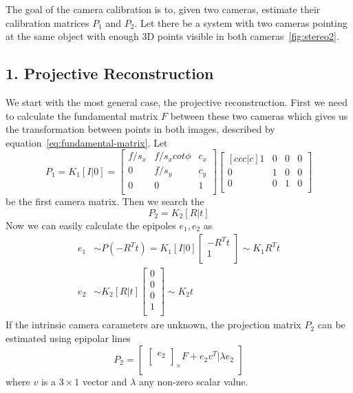 The goal of the camera calibration is to, given two cameras, estimate their calibration matrices $P_1$ and $P_2$. Let there be a system with two cameras pointing at the same object with enough 3D points visible in both cameras~\ref{fig:stereo2}. 
\subsection*{1. Projective Reconstruction}
We start with the most general case, the projective reconstruction. First we need to calculate the fundamental matrix $F$ between these two cameras which gives us the transformation between points in both images, described by equation~\ref{eq:fundamental-matrix}. Let
\begin{equation}
	P_1= K_1[I|0] =
	\begin{bmatrix}
		f/s_x & f/s_x  cot \phi & c_x \\
		0 & f/s_y & c_y \\
		0 & 0  & 1 \\
	\end{bmatrix}
	\begin{bmatrix}[ccc|c]
		1 & 0 & 0 & 0 \\
		0 & 1 & 0 & 0 \\
		0 & 0 & 1 & 0 \\
	\end{bmatrix}
\end{equation}
be the first camera matrix. Then we search the
\begin{equation}
	P_2 = K_2[R|t] 
\end{equation}
Now we can easily calculate the epipoles $e_1, e_2$ as
\begin{equation}
  \begin{aligned}
	e_1 &\sim P(-R^T t) = K_1 [I|0]
	\begin{bmatrix}
		-R^T t \\
		1 \\
	\end{bmatrix} \sim K_1 R^Tt \\
	e_2 &\sim K_2[R|t]
	\begin{bmatrix}
		0 \\
		0 \\
		0 \\
		1 \\
	\end{bmatrix} \sim K_2 t
  \end{aligned}
\end{equation}
If the intrinsic camera carameters are unknown, the projection matrix $P_2$ can be estimated using epipolar lines
\begin{equation}
	P_2 = 
	\begin{bmatrix}
		\begin{bmatrix}
			e_2 \\ 
		\end{bmatrix}_{\times} F + e_2 v^T | \lambda e_2 \\
	\end{bmatrix}
\end{equation}
where $v$ is a $3 \times 1$ vector and $\lambda$ any non-zero scalar value. 
